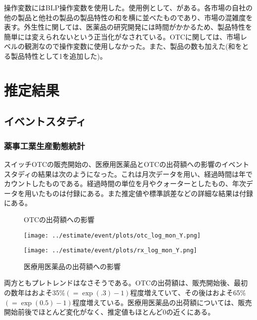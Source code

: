 \documentclass[a4paper,11pt,uplatex]{jsarticle}
\theoremstyle{definition}
\begin{document}
操作変数にはBLP操作変数を使用した。使用例として、\cite{Iizuka2007}がある。各市場の自社の他の製品と他社の製品の製品特性の和を横に並べたものであり、市場の混雑度を表す。外生性に関しては、医薬品の研究開発には時間がかかるため、製品特性を簡単には変えられないという正当化がなされている。OTCに関しては、市場レベルの観測なので操作変数に使用しなかった。また、製品の数も加えた(和をとる製品特性として1を追加した)。

\section{推定結果} 
\subsection{イベントスタディ}
\subsubsection{薬事工業生産動態統計}
スイッチOTCの販売開始の、医療用医薬品とOTCの出荷額への影響のイベントスタディの結果は次のようになった。これは月次データを用い、経過時間は年でカウントしたものである。経過時間の単位を月やクォーターとしたもの、年次データを用いたものは付録にある。また推定値や標準誤差などの詳細な結果は付録にある。
\begin{figure}[H]
    \centering
    \begin{minipage}{0.45\textwidth}
        \caption{OTCの出荷額への影響}
        \centering
        \texttt{[image: ../estimate/event/plots/otc\_log\_mon\_Y.png]}
    \end{minipage}\hfill
    \begin{minipage}{0.45\textwidth}
        \caption{医療用医薬品の出荷額への影響}
        \centering
        \texttt{[image: ../estimate/event/plots/rx\_log\_mon\_Y.png]}
    \end{minipage}
\end{figure}
両方ともプレトレンドはなさそうである。OTCの出荷額は、販売開始後、最初の数年はおよそ35\%\((=\exp(.3)-1)\)程度増えていて、その後はおよそ65\%\((=\exp(0.5)-1)\)程度増えている。医療用医薬品の出荷額については、販売開始前後でほとんど変化がなく、推定値もほとんど0の近くにある。
\end{document}
